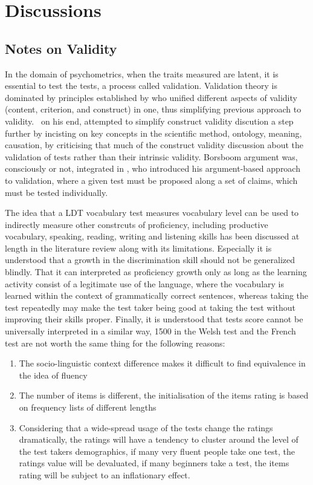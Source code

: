 \chapter{Discussions}

\section{Notes on Validity}
In the domain of psychometrics, when the traits measured are latent, it is essential to test the tests, a process called validation. Validation theory is dominated by principles established by \textcite{messick_validity_1987} who unified different aspects of validity (content, criterion, and construct) in one, thus simplifying previous approach to validity.\ \textcite{borsboom_concept_2004} on his end, attempted to simplify construct validity discution a step further by incisting on key concepts in the scientific method, ontology, meaning, causation, by criticising that much of the construct validity discussion about the validation of tests rather than their intrinsic validity. Borsboom argument was, consciously or not, integrated in \cite{kane_validating_2013}, who introduced his argument-based approach to validation, where a given test must be proposed along a set of claims, which must be tested individually.

The idea that a LDT vocabulary test measures vocabulary level can be used to indirectly measure other constrcuts of proficiency, including productive vocabulary, speaking, reading, writing and listening skills has been discussed at length in the literature review along with its limitations. Especially it is understood that a growth in the discrimination skill should not be generalized blindly. That it can interpreted as proficiency growth only as long as the learning activity consist of a legitimate use of the language, where the vocabulary is learned within the context of grammatically correct sentences, whereas taking the test repeatedly may make the test taker being good at taking the test without improving their skills proper. Finally, it is understood that tests score cannot be universally interpreted in a similar way, 1500 in the Welsh test and the French test are not worth the same thing for the following reasons:
\begin{enumerate}
  \item The socio-linguistic context difference makes it difficult to find equivalence in the idea of fluency
  \item The number of items is different, the initialisation of the items rating is based on frequency lists of different lengths
  \item Considering that a wide-spread usage of the tests change the ratings dramatically, the ratings will have a tendency to cluster around the level of the test takers demographics, if many very fluent people take one test, the ratings value will be devaluated, if many beginners take a test, the items rating will be subject to an inflationary effect.
\end{enumerate}

